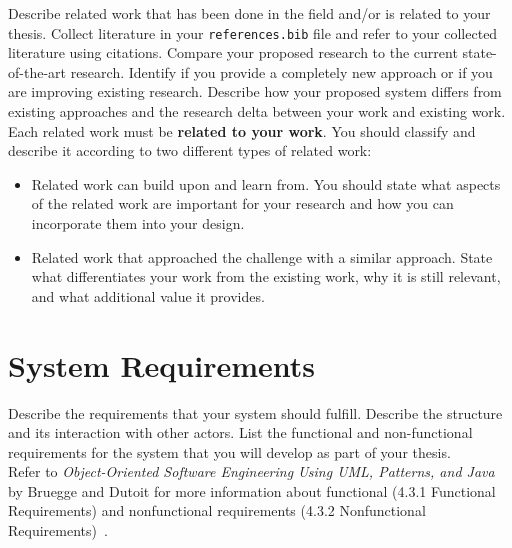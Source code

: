 \documentclass[
	pdftex,
	letterpaper,
	titlepage,
	final,
	oneside,
	11pt,
	DIV=calc,
]{scrbook}
\begin{document}
\begin{tcolorbox}[breakable]
	Describe related work that has been done in the field and/or is related to your thesis. 
	Collect literature in your \texttt{references.bib} file and refer to your collected literature using citations. 
	Compare your proposed research to the current state-of-the-art research.
	Identify if you provide a completely new approach or if you are improving existing research. 
	Describe how your proposed system differs from existing approaches and the research delta between your work and existing work.
	\\
	Each related work must be \textbf{related to your work}.
	You should classify and describe it according to two different types of related work:
	\begin{itemize}
		\item Related work can build upon and learn from. You should state what aspects of the related work are important for your research and how you can incorporate them into your design.
		\item Related work that approached the challenge with a similar approach. State what differentiates your work from the existing work, why it is still relevant, and what additional value it provides.	
	\end{itemize}
\end{tcolorbox}

\section*{System Requirements}

\begin{tcolorbox}[breakable]
	Describe the requirements that your system should fulfill. 
	Describe the structure and its interaction with other actors. 
	List the functional and non-functional requirements for the system that you will develop as part of your thesis. 
	\\
	Refer to \textit{Object-Oriented Software Engineering Using UML, Patterns, and Java} by Bruegge and Dutoit for more information about functional (4.3.1 Functional Requirements) and nonfunctional requirements (4.3.2 Nonfunctional Requirements)~\cite{bruegge2013object}.
\end{tcolorbox}
\end{document}
